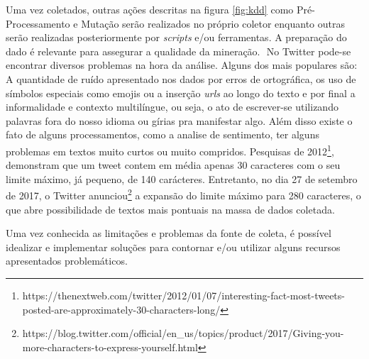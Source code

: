 Uma vez coletados, outras ações descritas na figura \ref{fig:kdd} como Pré-Processamento e Mutação serão realizados no próprio coletor enquanto outras serão realizadas posteriormente por \textit{scripts} e/ou ferramentas. A preparação do dado é relevante para assegurar a qualidade da mineração.  No Twitter pode-se encontrar diversos problemas na hora da análise. Alguns dos mais populares são: A quantidade de ruído apresentado nos dados por erros de ortográfica, os uso de símbolos especiais como emojis ou a inserção \textit{urls} ao longo do texto e por final a informalidade e contexto multilíngue, ou seja, o ato de escrever-se utilizando palavras fora do nosso idioma ou gírias pra manifestar algo. Além disso existe o fato de alguns processamentos, como a analise de sentimento, ter alguns problemas em textos muito curtos ou muito compridos. Pesquisas de 2012\footnote{https://thenextweb.com/twitter/2012/01/07/interesting-fact-most-tweets-posted-are-approximately-30-characters-long/}, demonstram que um tweet contem em média apenas 30 caracteres com o seu limite máximo, já pequeno, de 140 carácteres. \cite[9-11]{silva2016analise} Entretanto, no dia 27 de setembro de 2017, o Twitter anunciou\footnote{https://blog.twitter.com/official/en_us/topics/product/2017/Giving-you-more-characters-to-express-yourself.html} a expansão do limite máximo para 280 caracteres, o que abre possibilidade de textos mais pontuais na massa de dados coletada.

Uma vez conhecida as limitações e problemas da fonte de coleta, é possível idealizar e implementar soluções para contornar e/ou utilizar alguns recursos apresentados problemáticos.
